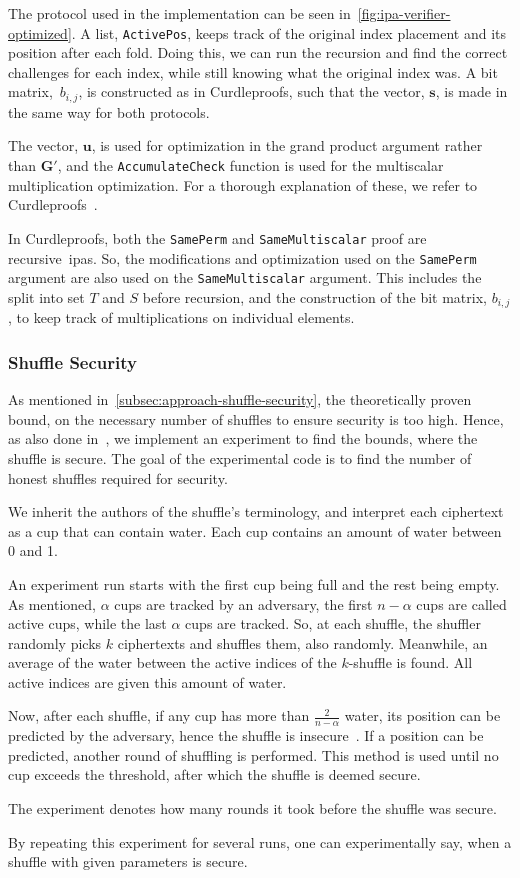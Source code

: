 The protocol used in the implementation can be seen in~\autoref{fig:ipa-verifier-optimized}.
A list, \texttt{ActivePos}, keeps track of the original index placement and its position after each fold.
Doing this, we can run the recursion and find the correct challenges for each index, while still knowing what the original index was.
A bit matrix,~$b_{i,j}$, is constructed as in Curdleproofs, such that the vector, $\mathbf{s}$, is made in the same way for both protocols.

The vector, $\mathbf{u}$, is used for optimization in the grand product argument rather than $\mathbf{G'}$, and the \texttt{AccumulateCheck} function is used for the multiscalar multiplication optimization.
For a thorough explanation of these, we refer to Curdleproofs~\cite{Curdleproofs}.

In Curdleproofs, both the \texttt{SamePerm} and \texttt{SameMultiscalar} proof are recursive~\glspl{ipa}.
So, the modifications and optimization used on the \texttt{SamePerm} argument are also used on the \texttt{SameMultiscalar} argument.
This includes the split into set $T$ and $S$ before recursion, and the construction of the bit matrix, $b_{i,j}$, to keep track of multiplications on individual elements.


\subsubsection{Shuffle Security}
As mentioned in~\autoref{subsec:approach-shuffle-security}, the theoretically proven bound, on the necessary number of shuffles to ensure security is too high.
Hence, as also done in~\cite{cryptoeprint:2022/560}, we implement an experiment to find the bounds, where the shuffle is secure.
The goal of the experimental code is to find the number of honest shuffles required for security.

We inherit the authors of the shuffle's terminology, and interpret each ciphertext as a cup that can contain water.
Each cup contains an amount of water between 0 and 1.

An experiment run starts with the first cup being full and the rest being empty.
As mentioned, $\alpha$ cups are tracked by an adversary, the first $n-\alpha$ cups are called active cups, while the last $\alpha$ cups are tracked.
So, at each shuffle, the shuffler randomly picks $k$ ciphertexts and shuffles them, also randomly.
Meanwhile, an average of the water between the active indices of the $k$-shuffle is found.
All active indices are given this amount of water.

Now, after each shuffle, if any cup has more than $\frac{2}{n-\alpha}$ water, its position can be predicted by the adversary, hence the shuffle is insecure~\cite{cryptoeprint:2022/560}.
If a position can be predicted, another round of shuffling is performed.
This method is used until no cup exceeds the threshold, after which the shuffle is deemed secure.

The experiment denotes how many rounds it took before the shuffle was secure.

By repeating this experiment for several runs, one can experimentally say, when a shuffle with given parameters is secure.

